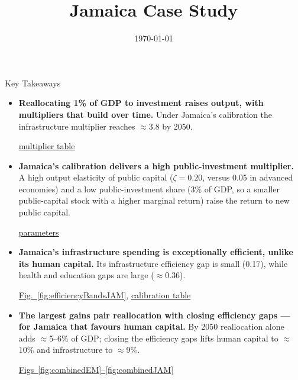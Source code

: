\documentclass[aspectratio=169, 11pt, t]{beamer}
\title[]{Jamaica Case Study}
\author{}
\institute{}
\date{\today}
\begin{document}
\begin{frame}[plain]
    \titlepage
\end{frame}

\begin{frame}{Key Takeaways}
    \small
    \begin{itemize}
        \setlength{\itemsep}{0.6em}
        \item \textbf{Reallocating 1\% of GDP to investment raises output, with multipliers that build over time.} Under Jamaica's calibration the infrastructure multiplier reaches $\approx$3.8 by 2050.
        {\footnotesize\par\hfill\hyperref[slide:mult]{multiplier table}}
        \item \textbf{Jamaica's calibration delivers a high public-investment multiplier.} A high output elasticity of public capital ($\zeta=0.20$, versus 0.05 in advanced economies) and a low public-investment share (3\% of GDP, so a smaller public-capital stock with a higher marginal return) raise the return to new public capital.
            {\footnotesize\par\hfill\hyperref[slide:params]{parameters}}
        \item \textbf{Jamaica's infrastructure spending is exceptionally efficient, unlike its human capital.} Its infrastructure efficiency gap is small (0.17), while health and education gaps are large ($\approx$0.36).
            {\footnotesize\par\hfill\hyperref[fig:efficiencyBandsJAM]{Fig.~\ref*{fig:efficiencyBandsJAM}}, \hyperref[slide:calib]{calibration table}}
        \item \textbf{The largest gains pair reallocation with closing efficiency gaps --- for Jamaica that favours human capital.} By 2050 reallocation alone adds $\approx$5--6\% of GDP; closing the efficiency gaps lifts human capital to $\approx$10\% and infrastructure to $\approx$9\%.
            {\footnotesize\par\hfill\hyperref[fig:combinedEM]{Figs~\ref*{fig:combinedEM}--\ref*{fig:combinedJAM}}}
    \end{itemize}
\end{frame}
\end{document}
